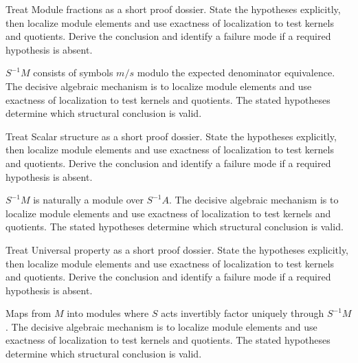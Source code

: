 \begin{problem}\label{prob:v07-problem-01}
Treat Module fractions as a short proof dossier. State the hypotheses explicitly, then localize module elements and use exactness of localization to test kernels and quotients. Derive the conclusion and identify a failure mode if a required hypothesis is absent.
\end{problem}
\begin{solution}
$S^{-1}M$ consists of symbols $m/s$ modulo the expected denominator equivalence. The decisive algebraic mechanism is to localize module elements and use exactness of localization to test kernels and quotients. The stated hypotheses determine which structural conclusion is valid.
\end{solution}

\begin{problem}\label{prob:v07-problem-02}
Treat Scalar structure as a short proof dossier. State the hypotheses explicitly, then localize module elements and use exactness of localization to test kernels and quotients. Derive the conclusion and identify a failure mode if a required hypothesis is absent.
\end{problem}
\begin{solution}
$S^{-1}M$ is naturally a module over $S^{-1}A$. The decisive algebraic mechanism is to localize module elements and use exactness of localization to test kernels and quotients. The stated hypotheses determine which structural conclusion is valid.
\end{solution}

\begin{problem}\label{prob:v07-problem-03}
Treat Universal property as a short proof dossier. State the hypotheses explicitly, then localize module elements and use exactness of localization to test kernels and quotients. Derive the conclusion and identify a failure mode if a required hypothesis is absent.
\end{problem}
\begin{solution}
Maps from $M$ into modules where $S$ acts invertibly factor uniquely through $S^{-1}M$. The decisive algebraic mechanism is to localize module elements and use exactness of localization to test kernels and quotients. The stated hypotheses determine which structural conclusion is valid.
\end{solution}

